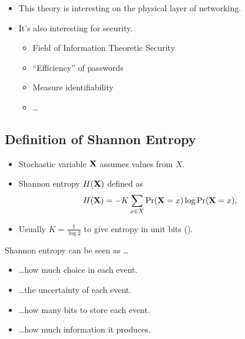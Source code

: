\begin{frame}
  \begin{itemize}
    \item This theory is interesting on the physical layer of networking.

      \pause{}

    \item It's also interesting for security.
      \begin{itemize}
        \item Field of Information Theoretic Security
        \item \enquote{Efficiency} of passwords
        \item Measure identifiability
        \item \dots
      \end{itemize}
  \end{itemize}
\end{frame}


\subsection{Definition of Shannon Entropy}

\begin{frame}
  \begin{definition}
    \begin{itemize}
      \item Stochastic variable \(\mathbf X\) assumes values from \(X\).
      \item Shannon entropy \(H(\mathbf X)\) defined as
        \begin{align*}
          H(\mathbf X) = -K \sum_{x\in X} \Pr(\mathbf X = x)\log \Pr(\mathbf X = x),
        \end{align*}
      \item Usually \(K = \frac{1}{\log 2}\) to give entropy in unit bits  
        (\si{\bit}).
    \end{itemize}
  \end{definition}
\end{frame}

\begin{frame}
  \begin{block}{Shannon entropy can be seen as \dots}
    \begin{itemize}
      \item \dots how much choice in each event.

      \item \dots the uncertainty of each event.

      \item \dots how many bits to store each event.

      \item \dots how much information it produces.

    \end{itemize}
  \end{block}
\end{frame}

